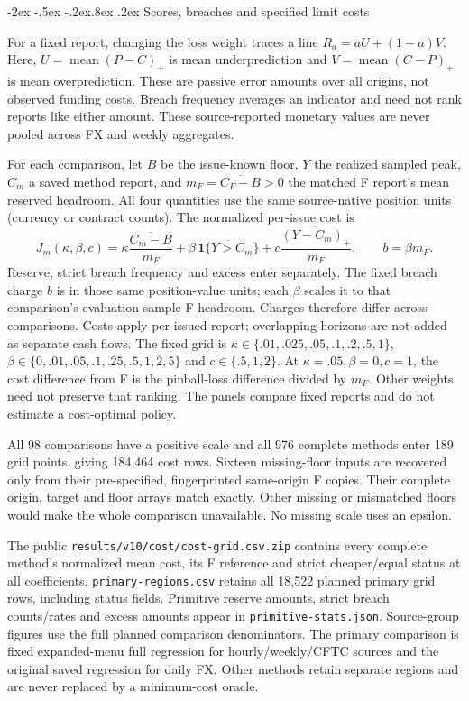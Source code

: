 \documentclass[10pt,a4paper]{article}
\makeatletter
\renewcommand\section{\@startsection{section}{1}{\z@}%
  {-2ex \@plus -.5ex \@minus -.2ex}{.8ex \@plus .2ex}%
  {\normalfont\large\bfseries}}
\makeatother
\begin{document}
\FloatBarrier


\section{Scores, breaches and specified limit costs}\label{sup:preference}\label{sup:frontier-0}\label{sup:wp3-murphy}\label{sup:v10-cost}\label{sup:v10-diagnostics}

For a fixed report, changing the loss weight traces a line
\(R_a=aU+(1-a)V\). Here, \(U=\operatorname{mean}(P-C)_+\) is mean underprediction and
\(V=\operatorname{mean}(C-P)_+\) is mean overprediction. These are passive error amounts over all
origins, not observed funding costs. Breach frequency averages an indicator and
need not rank reports like either amount. These source-reported monetary values are never pooled across FX and weekly aggregates.

For each comparison, let $B$ be the issue-known floor, $Y$ the realized sampled peak,
$C_m$ a saved method report, and $m_F=\overline{C_F-B}>0$ the matched F report's
mean reserved headroom. All four quantities use the same source-native position
units (currency or contract counts). The normalized per-issue cost is
\[
J_m(\kappa,\beta,c)=\kappa\frac{\overline{C_m-B}}{m_F}
+\beta\,\overline{\mathbf 1\{Y>C_m\}}
+c\frac{\overline{(Y-C_m)_+}}{m_F},\qquad b=\beta m_F.
\]
Reserve, strict breach frequency and excess enter separately. The fixed breach
charge $b$ is in those same position-value units; each $\beta$ scales it to that
comparison's evaluation-sample F headroom. Charges therefore differ across
comparisons. Costs apply per issued report; overlapping horizons are not
added as separate cash flows.
The fixed grid is $\kappa\in\{.01,.025,.05,.1,.2,.5,1\}$,
$\beta\in\{0,.01,.05,.1,.25,.5,1,2,5\}$ and $c\in\{.5,1,2\}$.
At $\kappa=.05,\beta=0,c=1$, the cost difference from F is the pinball-loss
difference divided by $m_F$. Other weights need not preserve that ranking.
The panels compare fixed reports and do not estimate a cost-optimal policy.

All 98 comparisons have a positive scale and all 976 complete methods enter 189 grid points, giving 184,464 cost rows. Sixteen missing-floor inputs are recovered only from their pre-specified, fingerprinted same-origin F copies. Their complete origin, target and floor arrays match exactly. Other missing or mismatched floors would make the whole comparison unavailable. No missing scale uses an epsilon.

The public \texttt{results/v10/cost/cost-grid.csv.zip} contains every complete method's normalized mean cost, its F reference and strict cheaper/equal status at all coefficients. \texttt{primary-regions.csv} retains all 18,522 planned primary grid rows, including status fields. Primitive reserve amounts, strict breach counts/rates and excess amounts appear in \texttt{primitive-stats.json}. Source-group figures use the full planned comparison denominators. The primary comparison is fixed expanded-menu full regression for hourly/weekly/CFTC sources and the original saved regression for daily FX. Other methods retain separate regions and are never replaced by a minimum-cost oracle.
\end{document}
